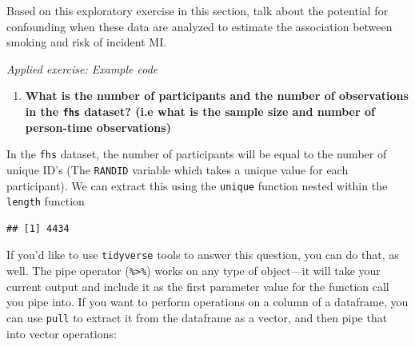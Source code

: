 \documentclass[
]{book}
\newenvironment{Shaded}{\begin{snugshade}}{\end{snugshade}}
\newcommand{\KeywordTok}[1]{\textcolor[rgb]{0.13,0.29,0.53}{\textbf{#1}}}
\newcommand{\NormalTok}[1]{#1}
\newcommand{\OperatorTok}[1]{\textcolor[rgb]{0.81,0.36,0.00}{\textbf{#1}}}
\newcommand{\StringTok}[1]{\textcolor[rgb]{0.31,0.60,0.02}{#1}}
\providecommand{\tightlist}{%
  \setlength{\itemsep}{0pt}\setlength{\parskip}{0pt}}
\begin{document}
Based on this exploratory exercise in this section, talk about the potential
for confounding when these data are analyzed to estimate the association between
smoking and risk of incident MI.

\emph{Applied exercise: Example code}

\begin{enumerate}
\def\labelenumi{\arabic{enumi}.}
\tightlist
\item
  \textbf{What is the number of participants and the number of observations in the \texttt{fhs} dataset? (i.e what is the sample size and number of person-time observations)}
\end{enumerate}

In the \texttt{fhs} dataset, the number of participants will be equal to the number of unique ID's (The \texttt{RANDID} variable which takes a unique value for each participant). We can extract this using the \texttt{unique} function nested within the \texttt{length} function

\begin{Shaded}
\end{Shaded}

\begin{verbatim}
## [1] 4434
\end{verbatim}

If you'd like to use \texttt{tidyverse} tools to answer this question, you can do
that, as well. The pipe operator (\texttt{\%\textgreater{}\%}) works on any type of object---it will
take your current output and include it as the first parameter value for the
function call you pipe into. If you want to perform operations on a column of
a dataframe, you can use \texttt{pull} to extract it from the dataframe as a vector, and
then pipe that into vector operations:

\begin{Shaded}
\end{Shaded}
\end{document}
